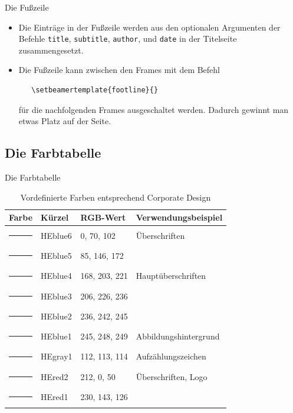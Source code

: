 \begin{frame}[fragile]{Die Fußzeile}
  \begin{itemize}
  \item Die Einträge in der Fußzeile werden aus den optionalen Argumenten der
  Befehle \texttt{title}, \texttt{subtitle}, \texttt{author},
  \texttt{\institute} und \texttt{date} in der Titelseite
  zusammengesetzt. 

  \item Die Fußzeile kann zwischen den Frames mit dem Befehl
\begin{verbatim}
   \setbeamertemplate{footline}{}
\end{verbatim}
für die nachfolgenden Frames ausgeschaltet werden. Dadurch gewinnt man etwas
Platz auf der Seite.
  \end{itemize}
\end{frame}


\subsection{Die Farbtabelle}

\begin{frame}{Die Farbtabelle}
\label{frame:Farbtabelle}
\begin{table}[h]
    \centering
    \caption{Vordefinierte Farben entsprechend Corporate Design}
      \begin{tabular}{clll}
        \toprule
        \textbf{Farbe} & \textbf{Kürzel} & \textbf{RGB-Wert} & \textbf{Verwendungsbeispiel} \\
        \midrule
        \color{HEblue6}\rule{30pt}{8pt} & HEblue6 &    0,   70,  102 & Überschriften \\
        \color{HEblue5}\rule{30pt}{8pt} & HEblue5 &   85,  146,  172 &  \\
        \color{HEblue4}\rule{30pt}{8pt} & HEblue4 &  168,  203,  221 & Hauptüberschriften \\
        \color{HEblue3}\rule{30pt}{8pt} & HEblue3 &  206,  226,  236 &  \\
        \color{HEblue2}\rule{30pt}{8pt} & HEblue2 &  236,  242,  245 &  \\
        \color{HEblue1}\rule{30pt}{8pt} & HEblue1 &  245,  248,  249 & Abbildungshintergrund \\
        \color{HEgray1}\rule{30pt}{8pt} & HEgray1 &  112,  113,  114 & Aufzählungszeichen \\
        \color{HEred2}\rule{30pt}{8pt}  & HEred2  &  212,    0,   50 & Überschriften, Logo \\
        \color{HEred1}\rule{30pt}{8pt}  & HEred1  &  230,  143,  126 &  \\
        \bottomrule
      \end{tabular}
  \end{table}
\end{frame}

